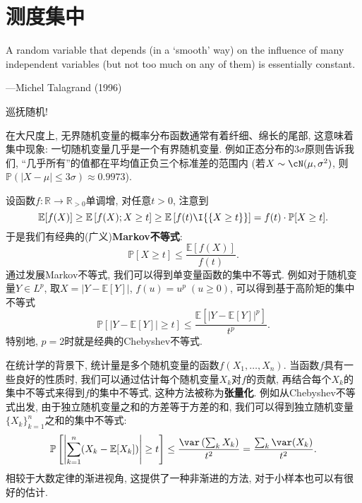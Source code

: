 \section{测度集中}

\epigraph{A random variable that depends (in a ‘smooth’ way) on the influence of many independent variables (but not too much on any of them) is essentially constant.}{---Michel Talagrand (1996)} 

巡抚随机!

在大尺度上, 无界随机变量的概率分布函数通常有着纤细、绵长的尾部, 这意味着集中现象: 一切随机变量几乎是一个有界随机变量.  
例如正态分布的$3 \sigma$原则告诉我们, “几乎所有”的值都在平均值正负三个标准差的范围内 (若$X \sim \cN(\mu, \sigma^2)$, 则$\mathbb{P}(|X - \mu| \leq 3 \sigma) \approx 0.9973$). 

设函数$f \colon \mathbb{R} \to \mathbb{R}_{>0}$单调增, 对任意$t > 0$, 注意到
\begin{equation*}
	\mathbb{E}[f(X)] 
		\geq \mathbb{E}\left[f(X); X \geq t \right]
		\geq \mathbb{E}\left[f(t) \I{\{X \geq t\}} \right] 
		= f(t) \cdot \mathbb{P}[X \geq t].
\end{equation*}
于是我们有经典的(广义)\textbf{Markov不等式}: 
\begin{equation}\label{eq:Markov'sInequality}
	\mathbb{P}[X \geq t] \leq \frac{\mathbb{E}[f(X)]}{f(t)}.
\end{equation}
通过发展Markov不等式, 我们可以得到单变量函数的集中不等式.
例如对于随机变量$Y \in L^p$, 取$X = |Y - \mathbb{E}[Y]|$, $f(u) = u^p\; (u \geq 0)$, 可以得到基于高阶矩的集中不等式
\begin{equation*}
	\mathbb{P}[|Y - \mathbb{E}[Y]| \geq t] \leq \frac{ \mathbb{E}[ |Y - \mathbb{E}[Y]|^p]}{t^p}. 
\end{equation*} 
特别地, $p=2$时就是经典的Chebyshev不等式. 

 

在统计学的背景下, 统计量是多个随机变量的函数$f(X_1, \dots, X_n)$. 
当函数$f$具有一些良好的性质时, 我们可以通过估计每个随机变量$X_k$对$f$的贡献, 再结合每个$X_k$的集中不等式来得到$f$的集中不等式, 这种方法被称为\textbf{张量化}. 
例如从Chebyshev不等式出发, 由于独立随机变量之和的方差等于方差的和, 我们可以得到独立随机变量$\{X_k\}_{k=1}^n$之和的集中不等式:  
\begin{equation*}
	\mathbb{P} \left[ \left|\sum_{k=1}^n (X_k - \mathbb{E}[X_k]) \right| \geq t \right]
	\leq \frac{\var\left(\sum_k  X_k\right)}{t^2}
	= \frac{\sum_k \var(X_k)}{t^2}. 
\end{equation*}
相较于大数定律的渐进视角, 这提供了一种非渐进的方法, 对于小样本也可以有很好的估计. 

